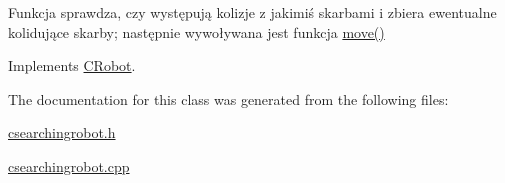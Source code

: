 Funkcja sprawdza, czy występują kolizje z jakimiś skarbami i zbiera ewentualne kolidujące skarby; następnie wywoływana jest funkcja \mbox{\hyperlink{class_c_searching_robot_a2c2150e7fd1cefbb5851e039cd76572f}{move()}} 



Implements \mbox{\hyperlink{class_c_robot_a8ad8d55a840ced20f85a2a045e9e24ef}{C\+Robot}}.



The documentation for this class was generated from the following files\+:\begin{DoxyCompactItemize}
\item 
\mbox{\hyperlink{csearchingrobot_8h}{csearchingrobot.\+h}}\item 
\mbox{\hyperlink{csearchingrobot_8cpp}{csearchingrobot.\+cpp}}\end{DoxyCompactItemize}
